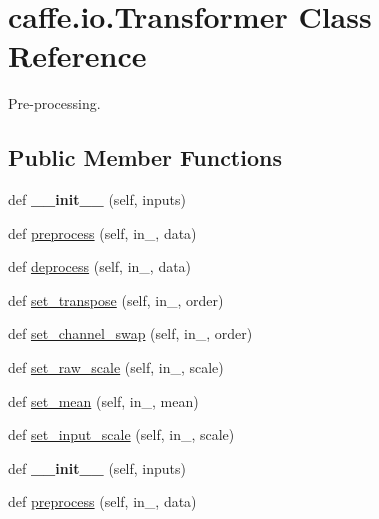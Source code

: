 \hypertarget{classcaffe_1_1io_1_1_transformer}{}\section{caffe.\+io.\+Transformer Class Reference}
\label{classcaffe_1_1io_1_1_transformer}


Pre-\/processing.  


\subsection*{Public Member Functions}
\begin{DoxyCompactItemize}
\item 
\mbox{\label{classcaffe_1_1io_1_1_transformer_aad3a0859254dddadbade7e60e624f855}} 
def {\bfseries \+\_\+\+\_\+init\+\_\+\+\_\+} (self, inputs)
\item 
def \mbox{\hyperlink{classcaffe_1_1io_1_1_transformer_a0b2d73743d661b36853fe3d963bd5fbb}{preprocess}} (self, in\+\_\+, data)
\item 
def \mbox{\hyperlink{classcaffe_1_1io_1_1_transformer_a3d048b7f8d255d29c04c2bcce0db318e}{deprocess}} (self, in\+\_\+, data)
\item 
def \mbox{\hyperlink{classcaffe_1_1io_1_1_transformer_af0acba3b0fe23e7fe33228600b18279a}{set\+\_\+transpose}} (self, in\+\_\+, order)
\item 
def \mbox{\hyperlink{classcaffe_1_1io_1_1_transformer_abd32a70aebb66e66de7567800547b114}{set\+\_\+channel\+\_\+swap}} (self, in\+\_\+, order)
\item 
def \mbox{\hyperlink{classcaffe_1_1io_1_1_transformer_aa02e06527de8f0e02d3065bf83b875a9}{set\+\_\+raw\+\_\+scale}} (self, in\+\_\+, scale)
\item 
def \mbox{\hyperlink{classcaffe_1_1io_1_1_transformer_a7064401b3aa295a6ab61895563a60d16}{set\+\_\+mean}} (self, in\+\_\+, mean)
\item 
def \mbox{\hyperlink{classcaffe_1_1io_1_1_transformer_ab3d72541298e2fb73a884df37e56f65c}{set\+\_\+input\+\_\+scale}} (self, in\+\_\+, scale)
\item 
\mbox{\label{classcaffe_1_1io_1_1_transformer_aad3a0859254dddadbade7e60e624f855}} 
def {\bfseries \+\_\+\+\_\+init\+\_\+\+\_\+} (self, inputs)
\item 
def \mbox{\hyperlink{classcaffe_1_1io_1_1_transformer_a0b2d73743d661b36853fe3d963bd5fbb}{preprocess}} (self, in\+\_\+, data)

\end{DoxyCompactItemize}
